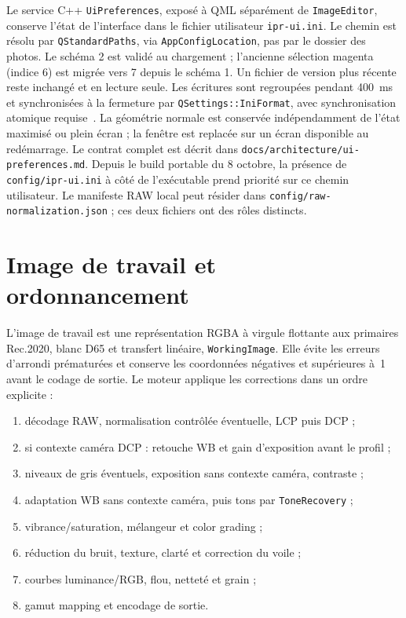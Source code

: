 Le service C++ \texttt{UiPreferences}, exposé à QML séparément de
\texttt{ImageEditor}, conserve l'état de l'interface dans le fichier utilisateur
\texttt{ipr-ui.ini}. Le chemin est résolu par
\texttt{QStandardPaths}, via \texttt{AppConfigLocation}, pas par le dossier des photos.
Le schéma 2 est validé au chargement ; l'ancienne sélection magenta (indice 6)
est migrée vers 7 depuis le schéma 1. Un fichier de version plus récente reste
inchangé et en lecture seule. Les écritures sont regroupées pendant 400~ms et
synchronisées à la fermeture par \texttt{QSettings::IniFormat}, avec
synchronisation atomique requise~\cite{qtQSettings,qtQStandardPaths}.
La géométrie normale est conservée indépendamment de l'état maximisé ou plein
écran ; la fenêtre est replacée sur un écran disponible au redémarrage.
Le contrat complet est décrit dans \texttt{docs/architecture/ui-preferences.md}.
Depuis le build portable du 8 octobre, la présence de
\texttt{config/ipr-ui.ini} à côté de l'exécutable prend priorité sur ce chemin
utilisateur. Le manifeste RAW local peut résider dans
\texttt{config/raw-normalization.json} ; ces deux fichiers ont des rôles distincts.

\section{Image de travail et ordonnancement}

L'image de travail est une représentation RGBA à virgule flottante aux primaires Rec.2020, blanc D65 et transfert linéaire, \texttt{WorkingImage}. Elle évite les erreurs d'arrondi prématurées et conserve les coordonnées négatives et supérieures à~1 avant le codage de sortie. Le moteur applique les corrections dans un ordre explicite :

\begin{enumerate}
  \item décodage RAW, normalisation contrôlée éventuelle, LCP puis DCP ;
  \item si contexte caméra DCP : retouche WB et gain d'exposition avant le profil ;
  \item niveaux de gris éventuels, exposition sans contexte caméra, contraste ;
  \item adaptation WB sans contexte caméra, puis tons par \texttt{ToneRecovery} ;
  \item vibrance/saturation, mélangeur et color grading ;
  \item réduction du bruit, texture, clarté et correction du voile ;
  \item courbes luminance/RGB, flou, netteté et grain ;
  \item gamut mapping et encodage de sortie.
\end{enumerate}

